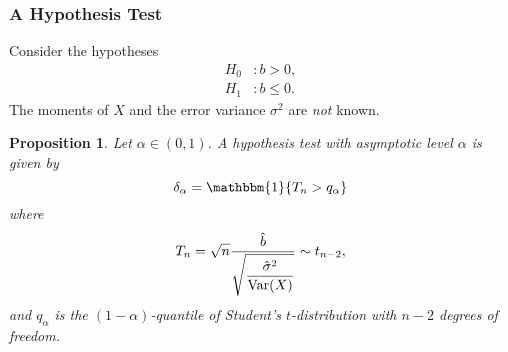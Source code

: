 \documentclass[letterpaper, reqno]{amsart}
\newtheorem{prop}{Proposition}[section]
\numberwithin{equation}{section}
\newcommand{\ddfrac}[2]{\frac{\displaystyle #1}{\displaystyle #2}}
\newcommand{\Var}[1]{\operatorname{Var}\mleft(#1\mright)}
\newcommand{\indic}[1]{\mathbbm{1}\mleft\{#1\mright\}} %
\begin{document}
\subsubsection{A Hypothesis Test}
Consider the hypotheses
\begin{align*}
  H_0 &\colon b > 0, \\
  H_1 &\colon b \le 0.
\end{align*}
The moments of $X$ and the error variance $\sigma^2$ are \emph{not} known.

\begin{prop}
  Let $\alpha \in (0, 1)$. A hypothesis test with asymptotic level $\alpha$ is
  given by
  \[ \delta_\alpha = \indic{T_n > q_\alpha} \]
  where
  \[ T_n = \sqrt{n}\ddfrac{\hat{b}}{\sqrt{\frac{\hat{\sigma}^2}{\Var{X}}}} \sim t_{n-2}, \]
  and $q_\alpha$ is the $(1-\alpha)$-quantile of Student's $t$-distribution
  with $n-2$ degrees of freedom.
\end{prop}
\end{document}
